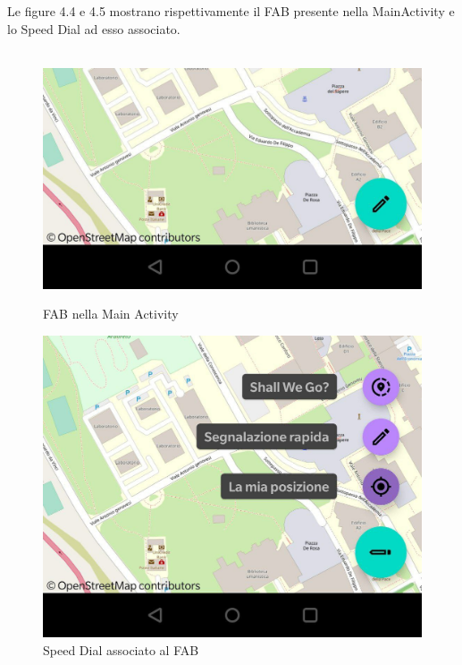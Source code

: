                     Le figure 4.4 e 4.5 mostrano rispettivamente il FAB presente nella MainActivity e lo Speed Dial ad esso associato.
                    \\
                    \\
                    \begin{figure}[ht]
                        \begin{minipage}[b]{0.45\linewidth}
                          \includegraphics[width=1.0\textwidth]{capitolo4/figure/fab.jpg}
                            \centering
                          \caption{FAB nella Main Activity}
                          \label{fig:FAB nella Main Activity}
                        \end{minipage}
                        \quad
                        \begin{minipage}[b]{0.45\linewidth}
                           \includegraphics[width=1.0\textwidth]{capitolo4/figure/speeddial.jpg}
                           \centering
                         \caption{Speed Dial associato al FAB}
                         \label{fig:Speed Dial associato al FAB}
                       \end{minipage}
                       \end{figure}
                    \newpage

